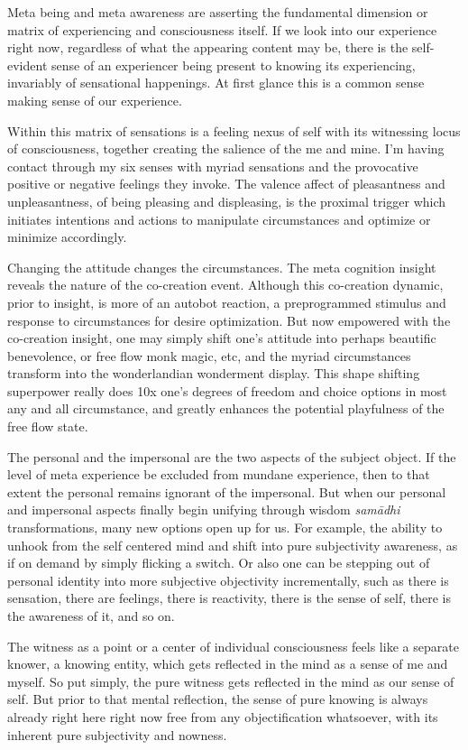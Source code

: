 \documentclass[12pt,openany]{book}
\begin{document}
Meta being and meta awareness are asserting the fundamental dimension or matrix of experiencing and consciousness itself. If we look into our experience right now, regardless of what the appearing content may be, there is the self-evident sense of an experiencer being present to knowing its experiencing, invariably of sensational happenings. At first glance this is a common sense making sense of our experience.

Within this matrix of sensations is a feeling nexus of self with its witnessing locus of consciousness, together creating the salience of the me and mine. I'm having contact through my six senses with myriad sensations and the provocative positive or negative feelings they invoke. The valence affect of pleasantness and unpleasantness, of being pleasing and displeasing, is the proximal trigger which initiates intentions and actions to manipulate circumstances and optimize or minimize accordingly.

Changing the attitude changes the circumstances. The meta cognition insight reveals the nature of the co-creation event. Although this co-creation dynamic, prior to insight, is more of an autobot reaction, a preprogrammed stimulus and response to circumstances for desire optimization. But now empowered with the co-creation insight, one may simply shift one's attitude into perhaps beautific benevolence, or free flow monk magic, etc, and the myriad circumstances transform into the wonderlandian wonderment display. This shape shifting superpower really does 10x one's degrees of freedom and choice options in most any and all circumstance, and greatly enhances the potential playfulness of the free flow state.

The personal and the impersonal are the two aspects of the subject object. If the level of meta experience be excluded from mundane experience, then to that extent the personal remains ignorant of the impersonal. But when our personal and impersonal aspects finally begin unifying through wisdom \textit{samādhi} transformations, many new options open up for us. For example, the ability to unhook from the self centered mind and shift into pure subjectivity awareness, as if on demand by simply flicking a switch. Or also one can be stepping out of personal identity into more subjective objectivity incrementally, such as there is sensation, there are feelings, there is reactivity, there is the sense of self, there is the awareness of it, and so on.

The witness as a point or a center of individual consciousness feels like a separate knower, a knowing entity, which gets reflected in the mind as a sense of me and myself. So put simply, the pure witness gets reflected in the mind as our sense of self. But prior to that mental reflection, the sense of pure knowing is always already right here right now free from any objectification whatsoever, with its inherent pure subjectivity and nowness.
\end{document}

